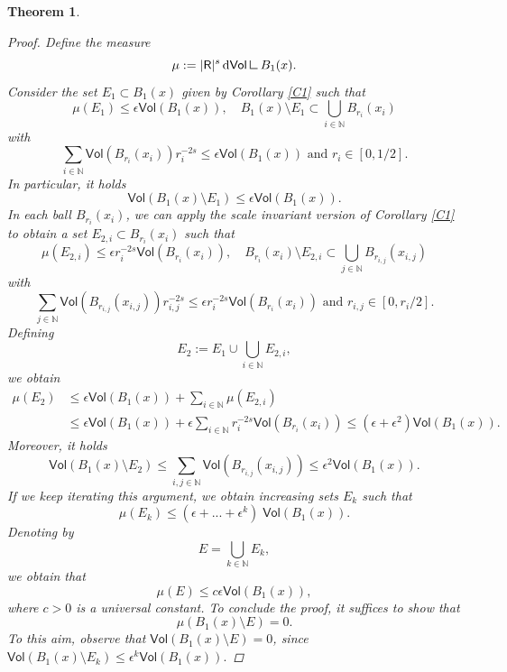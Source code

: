 \documentclass[10pt]{article}
\newtheorem{thm}{Theorem}[section]
\theoremstyle{definition}
\newcommand{\bb}[1]{\mathbb{#1}}
\newcommand{\ssf}[1]{\mathsf{#1}}
\newcommand{\R}{\mathsf{R}}
\newcommand{\de}{{\rm d}}
\newcommand{\mres}{\mathbin{\vrule height 1.6ex depth 0pt width
0.13ex\vrule height 0.13ex depth 0pt width 1.3ex}}
\begin{document}
\begin{thm}
\begin{proof}
        Define the measure $$\mu:=|\R|^s \,\de\ssf{Vol} \mres B_1(x).$$ Consider the set $E_1 \subset B_1(x)$ given by Corollary \ref{C1} such that
        \[
        \mu(E_1) \leq \epsilon \ssf{Vol}(B_1(x)),  \quad  B_1(x) \setminus E_1 \subset \bigcup_{i \in \bb{N}} B_{r_{i}}(x_{i}) 
        \]
        with 
        \[
        \sum_{i \in \bb{N}} \ssf{Vol}(B_{r_{i}}(x_{i}))r_{i}^{-2s} \leq \epsilon \ssf{Vol}(B_1(x)) \text{ and } r_i \in [0,1/2]. 
        \]
        In particular, it holds
        \[
        \ssf{Vol}(B_1(x) \setminus E_1) \leq 
        \epsilon \ssf{Vol}(B_1(x)).
        \]
        In each ball $B_{r_{i}}(x_{i})$, we can apply the scale invariant version of Corollary \ref{C1} to obtain a set $E_{2,i} \subset B_{r_{i}}(x_{i})$ such that
        \[
        \mu(E_{2,i}) \leq \epsilon  r_{i}^{-2s}\ssf{Vol}(B_{r_i}(x_i)), \quad  B_{r_{i}}(x_{i}) \setminus E_{2,i} \subset \bigcup_{j \in \bb{N}} B_{r_{i,j}}(x_{i,j})
        \]
        with
        \[ 
        \sum_{j \in \bb{N}} \ssf{Vol}(B_{r_{i,j}}(x_{i,j}))r_{i,j}^{-2s} \leq \epsilon  r_i^{-2s}\ssf{Vol}(B_{r_i}(x_i)) \text{ and } r_{i,j} \in [0,r_i/2]. 
        \]
        Defining 
        \[
        E_2 := E_1 \cup \bigcup_{i \in \bb{N}} E_{2,i},
        \]
        we obtain
        \begin{align*}
        \mu(E_2) & \leq \epsilon  \ssf{Vol}(B_1(x)) + \sum_{i \in \bb{N}} \mu (E_{2,i}) \\
        & \leq 
         \epsilon \ssf{Vol}(B_1(x))  + \epsilon  \sum_{i \in \bb{N}} r_{i}^{-2s} \ssf{Vol}(B_{r_i}(x_i))
         \leq (\epsilon +\epsilon ^2)\ssf{Vol}(B_1(x)) .
        \end{align*}
        Moreover, it holds
        \[
        \ssf{Vol}(B_1(x) \setminus E_2) \leq \sum_{i,j \in \bb{N}} \ssf{Vol}(B_{r_{i,j}}(x_{i,j}))
         \leq  {\epsilon}^2 \ssf{Vol}(B_1(x)).
        \]
        If we keep iterating this argument, we obtain increasing sets $E_k$ such that $$\mu(E_k) \leq (\epsilon + ... + \epsilon^k)\;\ssf{Vol}(B_1(x)).$$ Denoting by 
        $$E=\bigcup_{k\in \mathbb{N}} E_k,$$ we obtain that $$\mu(E) \leq c \epsilon \ssf{Vol}(B_1(x)),$$ where $c>0$ is a universal constant.  To conclude the proof, it suffices to show that 
        $$\mu(B_1(x)\setminus E)=0.$$ 
        To this aim, observe that $\ssf{Vol}(B_1(x)\setminus E)=0$,  since 
        $
        \ssf{Vol}(B_1(x) \setminus E_k) \leq {\epsilon}^k \ssf{Vol}(B_1(x)).
        $
\end{proof}
\end{thm}
\end{document}
